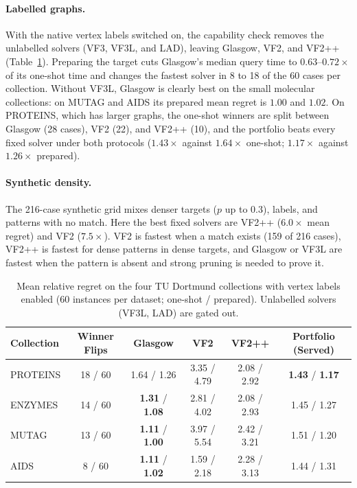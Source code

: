 \documentclass[11pt,a4paper]{article}
\begin{document}
\paragraph{Labelled graphs.} With the native vertex labels switched on, the capability check removes the unlabelled solvers (VF3, VF3L, and LAD), leaving Glasgow, VF2, and VF2++ (Table~\ref{tab:labelled}). Preparing the target cuts Glasgow's median query time to $0.63\text{--}0.72\times$ of its one-shot time and changes the fastest solver in 8 to 18 of the 60 cases per collection. Without VF3L, Glasgow is clearly best on the small molecular collections: on MUTAG and AIDS its prepared mean regret is $1.00$ and $1.02$. On PROTEINS, which has larger graphs, the one-shot winners are split between Glasgow (28 cases), VF2 (22), and VF2++ (10), and the portfolio beats every fixed solver under both protocols ($1.43\times$ against $1.64\times$ one-shot; $1.17\times$ against $1.26\times$ prepared).

\paragraph{Synthetic density.} The 216-case synthetic grid mixes denser targets ($p$ up to $0.3$), labels, and patterns with no match. Here the best fixed solvers are VF2++ ($6.0\times$ mean regret) and VF2 ($7.5\times$). VF2 is fastest when a match exists (159 of 216 cases), VF2++ is fastest for dense patterns in dense targets, and Glasgow or VF3L are fastest when the pattern is absent and strong pruning is needed to prove it.

\begin{table}[t]
\centering
\caption{Mean relative regret on the four TU Dortmund collections with vertex labels enabled (60 instances per dataset; one-shot / prepared). Unlabelled solvers (VF3L, LAD) are gated out.}
\label{tab:labelled}
\small
\setlength{\tabcolsep}{0pt}
\begin{tabular*}{\textwidth}{@{\extracolsep{\fill}}lccccc@{}}
\toprule
\textbf{Collection} & \textbf{Winner Flips} & \textbf{Glasgow} & \textbf{VF2} & \textbf{VF2++} & \textbf{Portfolio (Served)} \\
\midrule
PROTEINS & 18 / 60 & 1.64 / 1.26 & 3.35 / 4.79 & 2.08 / 2.92 & \textbf{1.43} / \textbf{1.17} \\
ENZYMES  & 14 / 60 & \textbf{1.31} / \textbf{1.08} & 2.81 / 4.02 & 2.08 / 2.93 & 1.45 / 1.27 \\
MUTAG    & 13 / 60 & \textbf{1.11} / \textbf{1.00} & 3.97 / 5.54 & 2.42 / 3.21 & 1.51 / 1.20 \\
AIDS     &  8 / 60 & \textbf{1.11} / \textbf{1.02} & 1.59 / 2.18 & 2.28 / 3.13 & 1.44 / 1.31 \\
\bottomrule
\end{tabular*}
\end{table}
\end{document}

